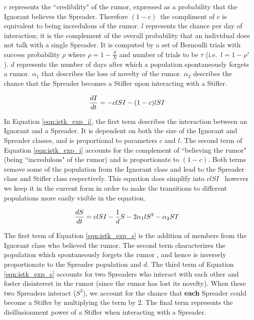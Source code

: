 $ c $ represents the ``credibility" of the rumor, expressed as a probability that the Ignorant believes the Spreader. Therefore $ (1 - c) $\, the compliment of $ c $ is equivalent to being incredulous of the rumor. $ l $ represents the chance per day of interaction; it is the complement of the overall probability that an individual does not talk with a single Spreader. It is computed by a set of Bernoulli trials with success probability $ \rho $ where $ \rho = 1 - \frac{S}{N} $ and number of trials to be $ \tau $ (i.e.~$ l = 1 - \rho^\tau $ ). $ d $ represents the number of days after which a population spontaneously forgets a rumor. $\alpha_1$ that describes the loss of novelty of the rumor. $ \alpha_2 $ describes the chance that the Spreader becomes a Stifler upon interacting with a Stifler.

\begin{equation}
\label{eqn:istk_exp_i}
\frac{dI}{dt}  = - clSI - (1-c)lSI \\
\end{equation}

In Equation \ref{eqn:istk_exp_i}, the first term describes the interaction between an Ignorant and a Spreader. It is dependent on both the size of the Ignorant and Spreader classes, and is proportional to parameters $ c $ and $ l $.  The second term of Equation \ref{eqn:istk_exp_i} accounts for the complement of ``believing the rumor" (being ``incredulous" of the rumor) and is proportionate to $ (1 - c) $. Both terms remove some of the population from the Ignorant class and lead to the Spreader class and Stifler class respectively. This equation does simplify into $ clSI $ \, however we keep it in the current form in order to make the transitions to different populations more easily visible in the equation.

\begin{equation}
\label{eqn:istk_exp_s} \frac{dS}{dt} = clSI - \frac{1}{d} S - 2 \alpha_1l S^2 - \alpha_2 ST \\
\end{equation}

The first term of Equation \ref{eqn:istk_exp_s} is the addition of members from the Ignorant class who believed the rumor. The second term characterizes the population which spontaneously forgets the rumor , and hence is inversely proportionate to the Spreader population and $ d $. The third term of Equation \ref{eqn:istk_exp_s} accounts for two Spreaders who interact with each other and foster disinterest in the rumor (since the rumor has lost its novelty). When these two Spreaders interact ($S^2$), we account for the chance that \textbf{each} Spreader could become a Stifler by multiplying the term by $ 2 $. The final term represents the disillusionment power of a Stifler when interacting with a Spreader.

